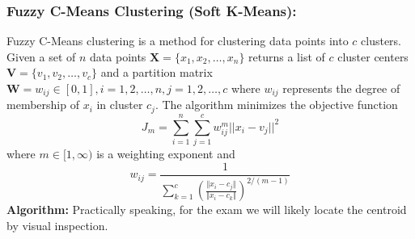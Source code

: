 \subsubsection{Fuzzy C-Means Clustering (Soft K-Means):} Fuzzy C-Means clustering is a method for clustering data points into \(c\) clusters. Given a set of \(n\) data points \(\mathbf{X}=\{x_1,x_2,\dots,x_n\}\) returns a list of \(c\) cluster centers \(\mathbf{V}=\{v_1,v_2,\dots,v_c\}\) and a partition matrix \(\mathbf{W}=w_{ij}\in [0,1],i=1,2,\dots,n,j=1,2,\dots,c\) where \(w_{ij}\) represents the degree of membership of \(x_i\) in cluster \(c_j\). The algorithm minimizes the objective function \[J_m=\sum_{i=1}^{n}\sum_{j=1}^{c}w_{ij}^m||x_i-v_j||^2\] where \(m\in{[1,\infty)}\) is a weighting exponent and \[w_{ij}=\frac{1}{\sum_{k=1}^c\left(\frac{\Vert x_i - c_j \Vert } {\Vert x_i - c_k \Vert} \right)^{2/(m-1)}}\]
\textbf{Algorithm:} Practically speaking, for the exam we will likely locate the centroid by visual inspection.